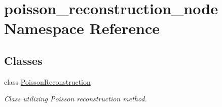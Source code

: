 \hypertarget{namespacepoisson__reconstruction__node}{}\section{poisson\+\_\+reconstruction\+\_\+node Namespace Reference}
\label{namespacepoisson__reconstruction__node}
\subsection*{Classes}
\begin{DoxyCompactItemize}
\item 
class \hyperlink{classpoisson__reconstruction__node_1_1_poisson_reconstruction}{Poisson\+Reconstruction}
\begin{DoxyCompactList}\small\item\em Class utilizing Poisson reconstruction method. \end{DoxyCompactList}\end{DoxyCompactItemize}
